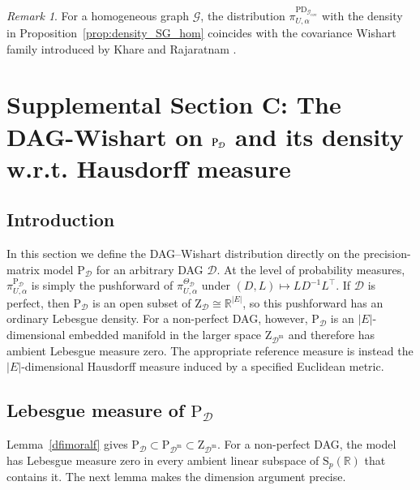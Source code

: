 \documentclass[12pt]{article}
\newcommand{\D}{\mathcal{D}}
\newcommand{\G}{\mathcal{G}}
\theoremstyle{plain}
\theoremstyle{definition}
\theoremstyle{remark}
\newtheorem{Rem}[theorem]{Remark}
\begin{document}
 \begin{Rem}
For a homogeneous graph $\G$, the distribution
$\pi_{U,\alpha}^{\mathrm{PD}_{\mathcal G_{\mathrm{cov}}}}$ with the density
in Proposition~\ref{prop:density_SG_hom} coincides with the covariance
Wishart family introduced by Khare and Rajaratnam \cite{khare09a*}.
\end{Rem}

%

\section*{Supplemental Section C: The DAG-Wishart on $\rm{P}_{\D}$ and its density w.r.t. Hausdorff measure}

\subsection*{Introduction}
In this section we define the DAG--Wishart distribution directly on the
precision-matrix model $\mathrm{P}_{\D}$ for an arbitrary DAG $\D$.  At the
level of probability measures, $\pi_{U,\alpha}^{\mathrm{P}_{\D}}$ is simply
the pushforward of $\pi_{U,\alpha}^{\Theta_{\D}}$ under
$(D,L)\mapsto LD^{-1}L^{\top}$.  If $\D$ is perfect, then
$\mathrm{P}_{\D}$ is an open subset of
$\mathrm{Z}_{\D}\cong\mathbb{R}^{|E|}$, so this pushforward has an ordinary
Lebesgue density.  For a non-perfect DAG, however,
$\mathrm{P}_{\D}$ is an $|E|$-dimensional embedded manifold in the larger
space $\mathrm{Z}_{\D^{\mathrm m}}$ and therefore has ambient Lebesgue
measure zero.  The appropriate reference measure is instead the
$|E|$-dimensional Hausdorff measure induced by a specified Euclidean metric.


 \subsection*{Lebesgue measure of $\mathrm{P}_\D$}

Lemma~\ref{dfimoralf} gives
$\mathrm{P}_{\D}\subset\mathrm{P}_{\D^{\mathrm m}}
\subset\mathrm{Z}_{\D^{\mathrm m}}$.  For a non-perfect DAG, the model has
Lebesgue measure zero in every ambient linear subspace of
$\mathrm S_p(\mathbb R)$ that contains it.  The next lemma makes the
dimension argument precise.
 
\end{document}
